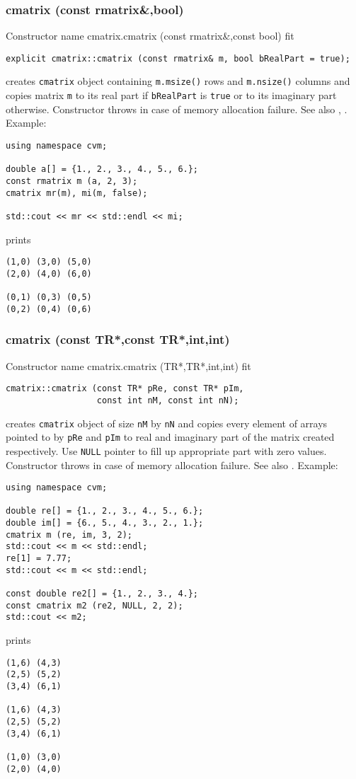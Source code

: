 \subsubsection{cmatrix (const rmatrix\&,bool)}
Constructor%
\pdfdest name {cmatrix.cmatrix (const rmatrix&,const bool)} fit
\begin{verbatim}
explicit cmatrix::cmatrix (const rmatrix& m, bool bRealPart = true);
\end{verbatim}
creates  \verb"cmatrix" object containing \verb"m.msize()" rows and
\verb"m.nsize()" columns
and copies matrix \verb"m" to its real part if
\verb"bRealPart" is \verb"true" or
to its imaginary part otherwise.
Constructor throws  
in case of memory allocation failure.
See also , .
Example:
\begin{Verbatim}
using namespace cvm;

double a[] = {1., 2., 3., 4., 5., 6.};
const rmatrix m (a, 2, 3);
cmatrix mr(m), mi(m, false);

std::cout << mr << std::endl << mi;
\end{Verbatim}
prints
\begin{Verbatim}
(1,0) (3,0) (5,0)
(2,0) (4,0) (6,0)

(0,1) (0,3) (0,5)
(0,2) (0,4) (0,6)
\end{Verbatim}
\newpage




\subsubsection{cmatrix (const TR*,const TR*,int,int)}
Constructor%
\pdfdest name {cmatrix.cmatrix (TR*,TR*,int,int)} fit
\begin{verbatim}
cmatrix::cmatrix (const TR* pRe, const TR* pIm,
                  const int nM, const int nN);
\end{verbatim}
creates  \verb"cmatrix" object
of size \verb"nM" by \verb"nN" and copies every
element of arrays pointed to by \verb"pRe" and \verb"pIm"
to  real and imaginary part of the matrix created respectively.
Use \verb"NULL" pointer to fill up appropriate
part with zero values.
Constructor throws  
in case of memory allocation failure.
See also .
Example:
\begin{Verbatim}
using namespace cvm;

double re[] = {1., 2., 3., 4., 5., 6.};
double im[] = {6., 5., 4., 3., 2., 1.};
cmatrix m (re, im, 3, 2);
std::cout << m << std::endl;
re[1] = 7.77;
std::cout << m << std::endl;

const double re2[] = {1., 2., 3., 4.};
const cmatrix m2 (re2, NULL, 2, 2);
std::cout << m2;
\end{Verbatim}
prints
\begin{Verbatim}
(1,6) (4,3)
(2,5) (5,2)
(3,4) (6,1)

(1,6) (4,3)
(2,5) (5,2)
(3,4) (6,1)

(1,0) (3,0)
(2,0) (4,0)
\end{Verbatim}
\newpage




